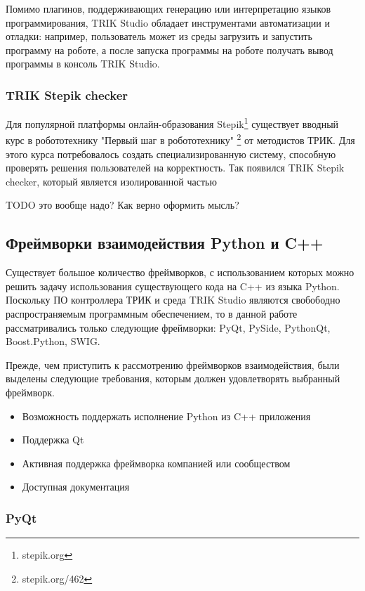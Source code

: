 \documentclass[14pt]{matmex-diploma-custom}
\begin{document}
Помимо плагинов, поддерживающих генерацию или интерпретацию языков программирования, TRIK Studio обладает инструментами автоматизации и отладки: например, пользователь может из среды загрузить и запустить программу на роботе, а после запуска программы на роботе получать вывод программы в консоль TRIK Studio.

\subsubsection{TRIK Stepik checker}
Для популярной платформы онлайн-образования Stepik\footnote{stepik.org} существует вводный курс в робототехнику "Первый шаг в робототехнику" \footnote{stepik.org/462} от методистов ТРИК. Для этого курса потребовалось создать специализированную систему, способную проверять решения пользователей на корректность. Так появился TRIK Stepik checker, который является изолированной частью

TODO это вообще надо? Как верно оформить мысль?

\subsection{Фреймворки взаимодействия Python и C++}

Существует большое количество фреймворков, с использованием которых можно решить задачу использования существующего кода на C++ из языка Python. Поскольку ПО контроллера ТРИК и среда TRIK Studio являются свобободно распространяемым программным обеспечением, то в данной работе рассматривались только следующие фреймворки: PyQt, PySide, PythonQt, Boost.Python, SWIG.

Прежде, чем приступить к рассмотрению фреймворков взаимодействия, были выделены следующие требования, которым должен удовлетворять выбранный фреймворк.

\begin{itemize}
    \item Возможность поддержать исполнение Python из C++ приложения
    \item Поддержка Qt
    \item Активная поддержка фреймворка компанией или сообществом
    \item Доступная документация
\end{itemize}

\subsubsection{PyQt}
\end{document}
